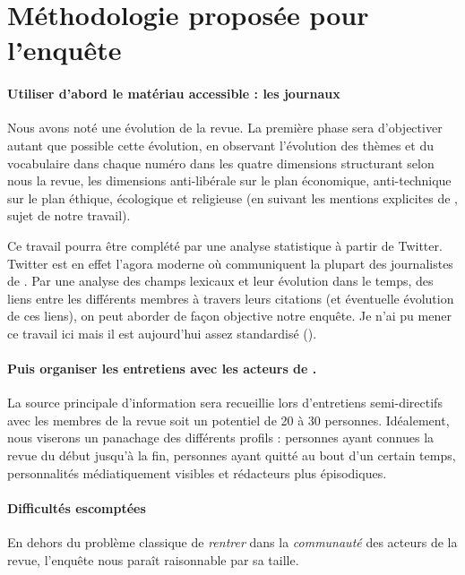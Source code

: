 
\section{Méthodologie proposée pour l'enquête}



\paragraph{Utiliser d'abord le matériau accessible : les journaux \RLimite} Nous avons noté une évolution de la revue. La première phase sera d'objectiver autant que possible cette évolution, en observant l'évolution des thèmes et du vocabulaire dans chaque numéro dans les quatre dimensions structurant selon nous la revue, les dimensions anti-libérale sur le plan économique, anti-technique sur le plan éthique, écologique et religieuse (en suivant les mentions explicites de \LS, sujet de notre travail). 


Ce travail pourra être complété par une analyse statistique à partir de  Twitter. Twitter est en effet l'agora moderne où communiquent la plupart des journalistes de \RLimite. Par une analyse des champs lexicaux et leur évolution dans le temps, des liens entre les différents membres à travers leurs citations (et éventuelle évolution de ces liens), on peut aborder de façon objective notre enquête. Je n'ai pu mener ce travail ici mais il est aujourd'hui assez standardisé (\cite{m_analyse_2020}).

\paragraph{Puis organiser les entretiens avec les acteurs de \RLimite.} La source principale d'information sera recueillie lors d'entretiens semi-directifs avec les membres de la revue soit un potentiel de 20 à 30 personnes. Idéalement, nous viserons un panachage des différents profils : personnes ayant connues la revue du début jusqu'à la fin, personnes ayant quitté \RLimite au bout d'un certain temps, personnalités médiatiquement visibles et rédacteurs plus épisodiques.

\paragraph{Difficultés escomptées} En dehors du problème classique de \textit{rentrer} dans la \textit{communauté} des acteurs de la revue, l'enquête nous paraît raisonnable par sa taille. 



